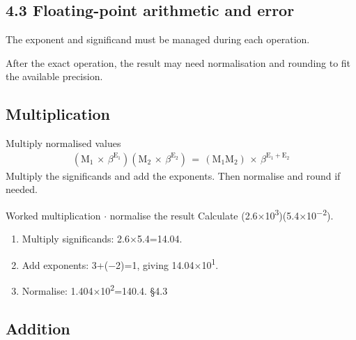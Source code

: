 \documentclass[11pt]{article}
\begin{document}
\begin{keepsection}
\section{4.3 Floating-point arithmetic and error}

The exponent and significand must be managed during each operation.

After the exact operation, the result may need normalisation and rounding to fit the available precision.

\begin{keepsection}
\subsection{Multiplication}

\begin{equationcard}{Multiply normalised values}
\[ \begin{gathered} (\mathrm{M}_{1}\, \times \, β^{\mathrm{E}_{1}})(\mathrm{M}_{2}\, \times \, β^{\mathrm{E}_{2}})\, =\, (\mathrm{M}_{1}\mathrm{M}_{2})\, \times \, β^{\mathrm{E}_{1}+\mathrm{E}_{2}} \end{gathered} \]
{\small Multiply the significands and add the exponents. Then normalise and round if needed.}
\end{equationcard}

\begin{workedbox}{Worked multiplication \ensuremath{\cdot} normalise the result}
Calculate (2.6\ensuremath{\times}10\textsuperscript{3})(5.4\ensuremath{\times}10\textsuperscript{\ensuremath{-}2}).

\begin{enumerate}
\item Multiply significands: 2.6\ensuremath{\times}5.4=14.04.
\item Add exponents: 3+(\ensuremath{-}2)=1, giving 14.04\ensuremath{\times}10\textsuperscript{1}.
\item Normalise: 1.404\ensuremath{\times}10\textsuperscript{2}=140.4. \hfill{\small\color{FAUblue}§4.3}
\end{enumerate}
\end{workedbox}
\end{keepsection}

\begin{keepsection}
\subsection{Addition}


\end{keepsection}
\end{keepsection}
\end{document}
